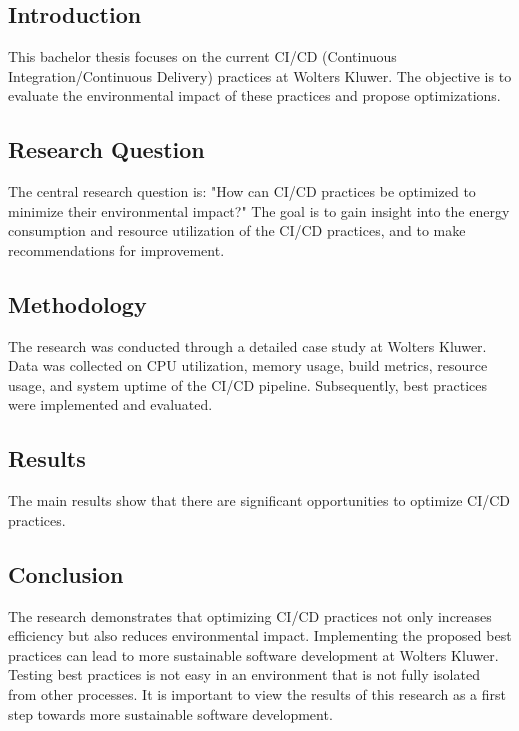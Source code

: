 
\chapter*{}

\section{Introduction}
This bachelor thesis focuses on the current CI/CD (Continuous Integration/Continuous Delivery) practices at Wolters Kluwer. The objective is to evaluate the environmental impact of these practices and propose optimizations.

\section{Research Question}
The central research question is: "How can CI/CD practices be optimized to minimize their environmental impact?" The goal is to gain insight into the energy consumption and resource utilization of the CI/CD practices, and to make recommendations for improvement.

\section{Methodology}
The research was conducted through a detailed case study at Wolters Kluwer. Data was collected on CPU utilization, memory usage, build metrics, resource usage, and system uptime of the CI/CD pipeline. Subsequently, best practices were implemented and evaluated.

\section{Results}
The main results show that there are significant opportunities to optimize CI/CD practices.

\section{Conclusion}
The research demonstrates that optimizing CI/CD practices not only increases efficiency but also reduces environmental impact. Implementing the proposed best practices can lead to more sustainable software development at Wolters Kluwer. Testing best practices is not easy in an environment that is not fully isolated from other processes. It is important to view the results of this research as a first step towards more sustainable software development.







